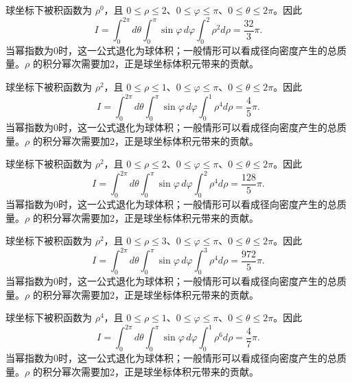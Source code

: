 \documentclass[12pt,fontset=fandol]{ctexart}
\begin{document}
\begin{solve}\label{ans:c38q14}
球坐标下被积函数为 $\rho^{0}$，且 $0\le\rho\le 2$、$0\le\varphi\le\pi$、$0\le\theta\le2\pi$。因此
\[
I=\int_0^{2\pi}d\theta\int_0^\pi\sin\varphi\,d\varphi\int_0^{2}\rho^{2}d\rho=\frac{32}{3}\pi.
\]
当幂指数为0时，这一公式退化为球体积；一般情形可以看成径向密度产生的总质量。$\rho$ 的积分幂次需要加2，正是球坐标体积元带来的贡献。
\end{solve}

\begin{solve}\label{ans:c38q15}
球坐标下被积函数为 $\rho^{2}$，且 $0\le\rho\le 1$、$0\le\varphi\le\pi$、$0\le\theta\le2\pi$。因此
\[
I=\int_0^{2\pi}d\theta\int_0^\pi\sin\varphi\,d\varphi\int_0^{1}\rho^{4}d\rho=\frac{4}{5}\pi.
\]
当幂指数为0时，这一公式退化为球体积；一般情形可以看成径向密度产生的总质量。$\rho$ 的积分幂次需要加2，正是球坐标体积元带来的贡献。
\end{solve}

\begin{solve}\label{ans:c38q16}
球坐标下被积函数为 $\rho^{2}$，且 $0\le\rho\le 2$、$0\le\varphi\le\pi$、$0\le\theta\le2\pi$。因此
\[
I=\int_0^{2\pi}d\theta\int_0^\pi\sin\varphi\,d\varphi\int_0^{2}\rho^{4}d\rho=\frac{128}{5}\pi.
\]
当幂指数为0时，这一公式退化为球体积；一般情形可以看成径向密度产生的总质量。$\rho$ 的积分幂次需要加2，正是球坐标体积元带来的贡献。
\end{solve}

\begin{solve}\label{ans:c38q17}
球坐标下被积函数为 $\rho^{2}$，且 $0\le\rho\le 3$、$0\le\varphi\le\pi$、$0\le\theta\le2\pi$。因此
\[
I=\int_0^{2\pi}d\theta\int_0^\pi\sin\varphi\,d\varphi\int_0^{3}\rho^{4}d\rho=\frac{972}{5}\pi.
\]
当幂指数为0时，这一公式退化为球体积；一般情形可以看成径向密度产生的总质量。$\rho$ 的积分幂次需要加2，正是球坐标体积元带来的贡献。
\end{solve}

\begin{solve}\label{ans:c38q18}
球坐标下被积函数为 $\rho^{4}$，且 $0\le\rho\le 1$、$0\le\varphi\le\pi$、$0\le\theta\le2\pi$。因此
\[
I=\int_0^{2\pi}d\theta\int_0^\pi\sin\varphi\,d\varphi\int_0^{1}\rho^{6}d\rho=\frac{4}{7}\pi.
\]
当幂指数为0时，这一公式退化为球体积；一般情形可以看成径向密度产生的总质量。$\rho$ 的积分幂次需要加2，正是球坐标体积元带来的贡献。
\end{solve}
\end{document}
